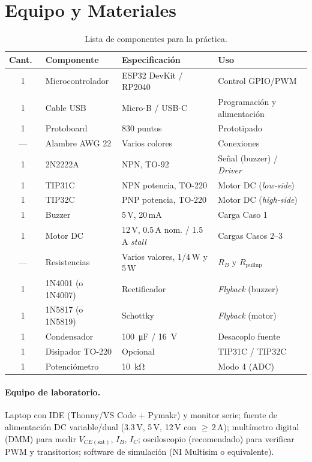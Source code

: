 \documentclass[11pt]{article}
\begin{document}
\section{Equipo y Materiales}
\begin{table}[H]\centering
\caption{Lista de componentes para la práctica.}
\begin{tabular}{cll l}
\toprule
Cant.\ & Componente & Especificación & Uso \\
\midrule
1 & Microcontrolador & ESP32 DevKit / RP2040 & Control GPIO/PWM \\
1 & Cable USB & Micro-B / USB-C & Programación y alimentación \\
1 & Protoboard & 830 puntos & Prototipado \\
--- & Alambre AWG 22 & Varios colores & Conexiones \\
1 & 2N2222A & NPN, TO-92 & Señal (buzzer) / \emph{Driver} \\
1 & TIP31C & NPN potencia, TO-220 & Motor DC (\emph{low-side}) \\
1 & TIP32C & PNP potencia, TO-220 & Motor DC (\emph{high-side}) \\
1 & Buzzer & 5\,V, 20\,mA & Carga Caso 1 \\
1 & Motor DC & 12\,V, 0.5\,A nom. / 1.5\,A \emph{stall} & Cargas Casos 2--3 \\
--- & Resistencias & Varios valores, 1/4\,W y 5\,W & $R_B$ y $R_\text{pullup}$ \\
1 & 1N4001 (o 1N4007) & Rectificador & \emph{Flyback} (buzzer) \\
1 & 1N5817 (o 1N5819) & Schottky & \emph{Flyback} (motor) \\
1 & Condensador & \SI{100}{\micro\farad} / \SI{16}{\volt} & Desacoplo fuente \\
1 & Disipador TO-220 & Opcional & TIP31C / TIP32C \\
1 & Potenciómetro & \SI{10}{\kilo\ohm} & Modo 4 (ADC) \\
\bottomrule
\end{tabular}
\end{table}

\paragraph{Equipo de laboratorio.} Laptop con IDE (Thonny/VS Code + Pymakr) y monitor
serie; fuente de alimentación DC variable/dual (3.3\,V, 5\,V, 12\,V con $\ge$\,2\,A);
multímetro digital (DMM) para medir $V_{CE(\text{sat})}$, $I_B$, $I_C$; osciloscopio
(recomendado) para verificar PWM y transitorios; software de simulación (NI Multisim o
equivalente).
\end{document}
